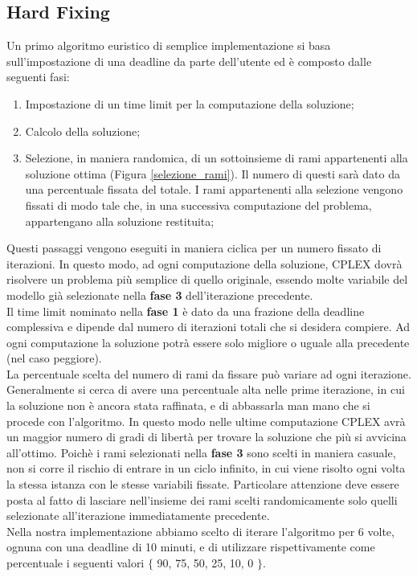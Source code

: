 \subsection{Hard Fixing}\label{hard fixing}
Un primo algoritmo euristico di semplice implementazione si basa sull'impostazione di una deadline da parte dell'utente ed è composto dalle seguenti fasi:
\begin{enumerate}
\item{Impostazione di un time limit per la computazione della soluzione;}
\item{Calcolo della soluzione;}
\item{Selezione, in maniera randomica, di un sottoinsieme di rami appartenenti alla soluzione ottima (Figura \ref{selezione_rami}). 
Il numero di questi sarà dato da una percentuale fissata del totale. I rami appartenenti alla selezione vengono fissati di modo tale che, in una successiva computazione del problema, appartengano alla soluzione restituita;}
\end{enumerate} 
Questi passaggi vengono eseguiti in maniera ciclica per un numero fissato di iterazioni. In questo modo, ad ogni computazione della soluzione, CPLEX dovrà risolvere un problema più semplice di quello originale, essendo molte variabile del modello già selezionate nella \textbf{fase 3} dell'iterazione precedente.\\
Il time limit nominato nella \textbf{fase 1} è dato da una frazione della deadline complessiva e dipende dal numero di iterazioni totali che si desidera compiere. Ad ogni computazione la soluzione potrà essere solo migliore o uguale alla precedente (nel caso peggiore).\\
La percentuale scelta del numero di rami da fissare può variare ad ogni iterazione. Generalmente si cerca di avere una percentuale alta nelle prime iterazione, in cui la soluzione non è ancora stata raffinata, e di abbassarla man mano che si procede con l'algoritmo. In questo modo nelle ultime computazione CPLEX avrà un maggior numero di gradi di libertà per trovare la soluzione che più si avvicina all'ottimo. Poichè i rami selezionati nella \textbf{fase 3} sono scelti in maniera casuale, non si corre il rischio di entrare in un ciclo infinito, in cui viene risolto ogni volta la stessa istanza con le stesse variabili fissate. Particolare attenzione deve essere posta al fatto di lasciare nell'insieme dei rami scelti randomicamente solo quelli selezionate all'iterazione immediatamente precedente.\\
Nella nostra implementazione abbiamo scelto di iterare l'algoritmo per 6 volte, ognuna con una deadline di 10 minuti, e di utilizzare rispettivamente come percentuale i seguenti valori $\lbrace$ 90, 75, 50, 25, 10, 0 $\rbrace$.\\
